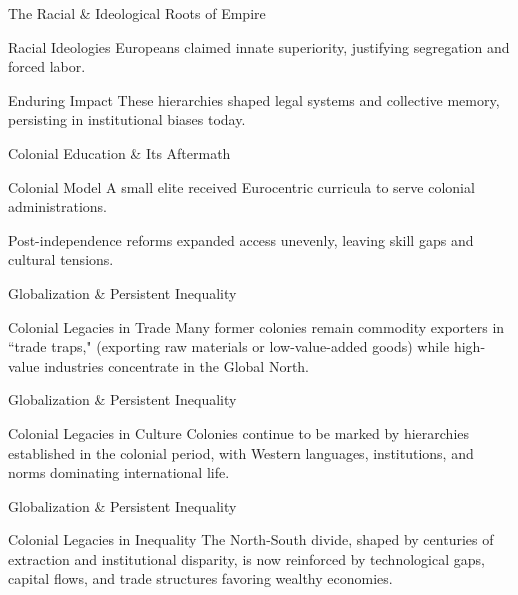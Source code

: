 \documentclass[aspectratio=169]{beamer}
\begin{document}
\begin{frame}{The Racial \& Ideological Roots of Empire}
  \begin{exampleblock}{Racial Ideologies}
    Europeans claimed innate superiority, justifying segregation and forced labor.
  \end{exampleblock}
  \vspace{0.5em}
  \begin{alertblock}{Enduring Impact}
    These hierarchies shaped legal systems and collective memory, persisting in institutional biases today.
  \end{alertblock}
\end{frame}

\begin{frame}{Colonial Education \& Its Aftermath}
  \begin{block}{Colonial Model}
    A small elite received Eurocentric curricula to serve colonial administrations.
  \end{block}
  \vspace{0.5em}
  Post-independence reforms expanded access unevenly, leaving skill gaps and cultural tensions.
\end{frame}

\begin{frame}{Globalization \& Persistent Inequality}
  \begin{block}{Colonial Legacies in Trade}
    Many former colonies remain commodity exporters in ``trade traps," (exporting raw materials or low-value-added goods) while high-value industries concentrate in the Global North.
  \end{block}
  \vspace{0.5em}
\end{frame}

\begin{frame}{Globalization \& Persistent Inequality}
  \begin{block}{Colonial Legacies in Culture}
   Colonies continue to be marked by hierarchies established in the
colonial period, with Western languages, institutions, and norms dominating
international life.  \end{block}
  \vspace{0.5em}
\end{frame}

\begin{frame}{Globalization \& Persistent Inequality}
  \begin{block}{Colonial Legacies in Inequality}
   The North-South divide, shaped by centuries of extraction and
institutional disparity, is now reinforced by technological gaps, capital flows, and
trade structures favoring wealthy economies.  \end{block}
  \vspace{0.5em}
\end{frame}
\end{document}
